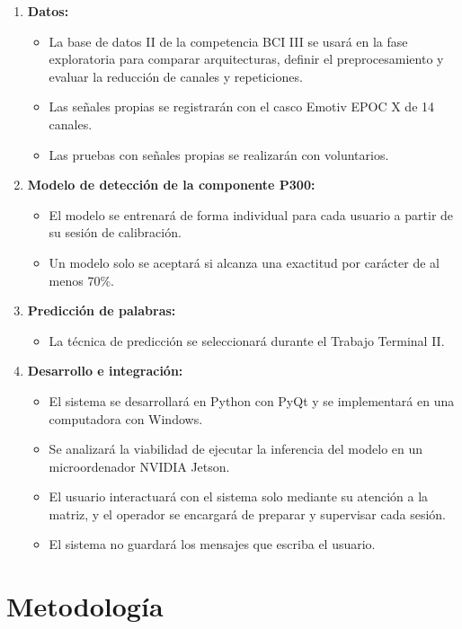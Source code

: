 \begin{enumerate}
  \item \textbf{Datos:}
  \begin{itemize}
    \item La base de datos II de la competencia BCI III se usará en la fase exploratoria para
    comparar arquitecturas, definir el preprocesamiento y evaluar la reducción de canales y
    repeticiones.
    \item Las señales propias se registrarán con el casco Emotiv EPOC X de 14 canales.
    \item Las pruebas con señales propias se realizarán con voluntarios.
  \end{itemize}
  \item \textbf{Modelo de detección de la componente P300:}
  \begin{itemize}
    \item El modelo se entrenará de forma individual para cada usuario a partir de su sesión de
    calibración.
    \item Un modelo solo se aceptará si alcanza una exactitud por carácter de al menos 70\%.
  \end{itemize}
  \item \textbf{Predicción de palabras:}
  \begin{itemize}
    \item La técnica de predicción se seleccionará durante el Trabajo Terminal II.
  \end{itemize}
  \item \textbf{Desarrollo e integración:}
  \begin{itemize}
    \item El sistema se desarrollará en Python con PyQt y se implementará en una computadora con
    Windows.
    \item Se analizará la viabilidad de ejecutar la inferencia del modelo en un microordenador
    NVIDIA Jetson.
    \item El usuario interactuará con el sistema solo mediante su atención a la matriz, y el
    operador se encargará de preparar y supervisar cada sesión.
    \item El sistema no guardará los mensajes que escriba el usuario.
  \end{itemize}
\end{enumerate}

\section[METODOLOGÍA]{Metodología}
\label{sec:metodologia}

